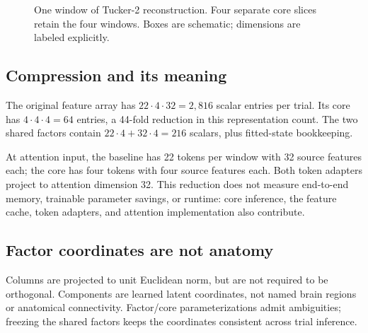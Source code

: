 \documentclass[11pt,a4paper]{article}
\begin{document}
\begin{figure}[h!]
\centering
{}
\caption{One window of Tucker-2 reconstruction. Four separate core slices
retain the four windows. Boxes are schematic; dimensions are labeled explicitly.}
\end{figure}

\subsection{Compression and its meaning}
The original feature array has \(22\cdot4\cdot32=2{,}816\) scalar entries per
trial. Its core has \(4\cdot4\cdot4=64\) entries, a 44-fold reduction in this
representation count. The two shared factors contain
\(22\cdot4+32\cdot4=216\) scalars, plus fitted-state bookkeeping.

At attention input, the baseline has 22 tokens per window with 32 source
features each; the core has four tokens with four source features each.
Both token adapters project to attention dimension 32. This reduction does not
measure end-to-end memory, trainable parameter savings, or runtime: core inference,
the feature cache, token adapters, and attention implementation also contribute.

\subsection{Factor coordinates are not anatomy}
Columns are projected to unit Euclidean norm, but are not required to be
orthogonal. Components are learned latent coordinates, not named brain regions
or anatomical connectivity. Factor/core parameterizations admit ambiguities;
freezing the shared factors keeps the coordinates consistent across trial inference.
\end{document}
